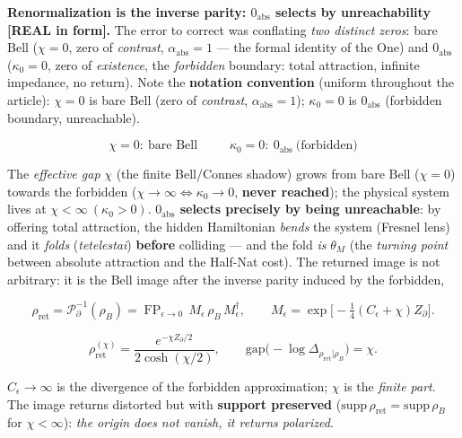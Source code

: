 \documentclass[11pt]{article}
\theoremstyle{definition}\newtheorem{deriv}{Derivation}
\begin{document}
\textbf{Renormalization is the inverse parity: $0_{\mathrm{abs}}$ selects by unreachability \textsf{[REAL in form]}.} The error to correct was conflating \emph{two distinct zeros}: bare Bell ($\chi=0$, zero of \emph{contrast}, $\alpha_{\mathrm{abs}}=1$ --- the formal identity of the One) and $0_{\mathrm{abs}}$ ($\kappa_0=0$, zero of \emph{existence}, the \emph{forbidden} boundary: total attraction, infinite impedance, no return). Note the \textbf{notation convention} (uniform throughout the article): $\chi=0$ is bare Bell (zero of \emph{contrast}, $\alpha_{\mathrm{abs}}=1$); $\kappa_0=0$ is $0_{\mathrm{abs}}$ (forbidden boundary, unreachable).

\begin{equation}\boxed{\;\chi=0:\ \text{bare Bell}\;}\qquad \boxed{\;\kappa_0=0:\ 0_{\mathrm{abs}}\ \text{(forbidden)}\;}\end{equation}

The \emph{effective gap} $\chi$ (the finite Bell/Connes shadow) grows from bare Bell ($\chi=0$) towards the forbidden ($\chi\to\infty\Leftrightarrow\kappa_0\to0$, \textbf{never reached}); the physical system lives at $\chi<\infty\ (\kappa_0>0)$. \textbf{$0_{\mathrm{abs}}$ selects precisely by being unreachable}: by offering total attraction, the hidden Hamiltonian \emph{bends} the system (Fresnel lens) and it \emph{folds} (\textit{tetelestai}) \textbf{before} colliding --- and the fold \emph{is} $\theta_M$ (the \emph{turning point} between absolute attraction and the Half-Nat cost). The returned image is not arbitrary: it is the Bell image after the inverse parity induced by the forbidden,

\begin{equation}\rho_{\mathrm{ret}}=\mathcal P_\partial^{-1}(\rho_B)=\operatorname{FP}_{\epsilon\to0}\,M_\epsilon\,\rho_B\,M_\epsilon^\dagger,\qquad M_\epsilon=\exp\!\big[-\tfrac14(C_\epsilon+\chi)Z_\partial\big].\end{equation}

\begin{equation}\rho_{\mathrm{ret}}^{(\chi)}=\frac{e^{-\chi Z_\partial/2}}{2\cosh(\chi/2)},\qquad \mathrm{gap}\big({-}\log\Delta_{\rho_{\mathrm{ret}}|\rho_B}\big)=\chi.\end{equation}

$C_\epsilon\to\infty$ is the divergence of the forbidden approximation; $\chi$ is the \emph{finite part}. The image returns distorted but with \textbf{support preserved} ($\mathrm{supp}\,\rho_{\mathrm{ret}}=\mathrm{supp}\,\rho_B$ for $\chi<\infty$): \emph{the origin does not vanish, it returns polarized}.
\end{document}
